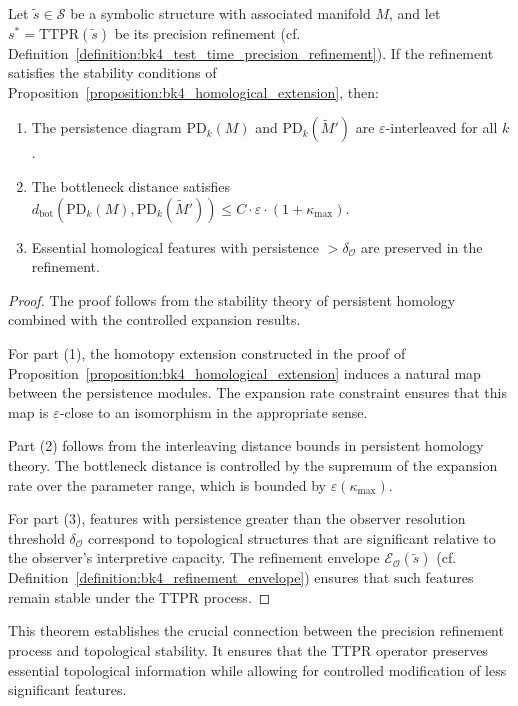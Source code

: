 \begin{theorem}
\label{theorem:bk4_topological_persistence_under_refinement}
Let $\tilde{s} \in \mathcal{S}$ be a symbolic structure with associated manifold $M$, and let $s^* = \mathrm{TTPR}(\tilde{s})$ be its precision refinement (cf. Definition~\ref{definition:bk4_test_time_precision_refinement}). If the refinement satisfies the stability conditions of Proposition~\ref{proposition:bk4_homological_extension}, then:
\begin{enumerate}
\item The persistence diagram $\text{PD}_k(M)$ and $\text{PD}_k(\widetilde{M}')$ are $\varepsilon$-interleaved for all $k$.
\item The bottleneck distance satisfies $d_{\text{bot}}(\text{PD}_k(M), \text{PD}_k(\widetilde{M}')) \leq C \cdot \varepsilon \cdot (1 + \kappa_{\max})$.
\item Essential homological features with persistence $> \delta_{\mathcal{O}}$ are preserved in the refinement.
\end{enumerate}
\end{theorem}

\begin{proof}
\label{proof:bk4_topological_persistence}
The proof follows from the stability theory of persistent homology combined with the controlled expansion results.

For part (1), the homotopy extension constructed in the proof of Proposition~\ref{proposition:bk4_homological_extension} induces a natural map between the persistence modules. The expansion rate constraint ensures that this map is $\varepsilon$-close to an isomorphism in the appropriate sense.

Part (2) follows from the interleaving distance bounds in persistent homology theory. The bottleneck distance is controlled by the supremum of the expansion rate over the parameter range, which is bounded by $\varepsilon(\kappa_{\max})$.

For part (3), features with persistence greater than the observer resolution threshold $\delta_{\mathcal{O}}$ correspond to topological structures that are significant relative to the observer's interpretive capacity. The refinement envelope $\mathcal{E}_{\mathcal{O}}(\tilde{s})$ (cf. Definition~\ref{definition:bk4_refinement_envelope}) ensures that such features remain stable under the TTPR process.
\end{proof}

This theorem establishes the crucial connection between the precision refinement process and topological stability. It ensures that the TTPR operator preserves essential topological information while allowing for controlled modification of less significant features.

